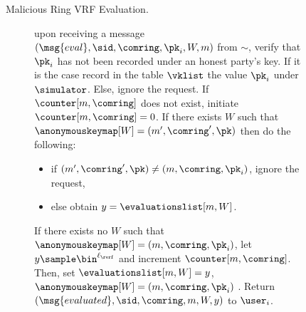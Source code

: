 \begin{figure}
\begin{tcolorbox}
{\begin{description}
				\item[Malicious Ring VRF Evaluation.] upon receiving a message $(\msg{eval}, \sid, \comring, \pk_i, W, m)$ from $\sim$, verify that $ \pk_i $ has not been recorded under an honest party's key.
			    If it is the case record in the table $\vklist$ the value $\pk_i$ under $\simulator$. Else, ignore the request.  If $ \counter[m,\comring] $ does not exist, initiate $ \counter[m,\comring] = 0 $.
			    If there exists $ W $ such that $ \anonymouskeymap[W] = (m',\comring', \pk)$ then do the following:
			    \begin{itemize}
			    	\item if $(m', \comring', \pk) \neq  (m, \comring, \pk_i)  $, ignore the request,
			    	\item else obtain $ y = \evaluationslist[m, W]   $. 
			    \end{itemize}
				If there exists no $ W $ such that $ \anonymouskeymap[W] = (m, \comring, \pk_i) $, let   $y \sample \bin^{\ell_\rvrf}$ and increment $ \counter[m,\comring] $. Then, set $ \evaluationslist[m, W] = y$, $ \anonymouskeymap[W] = (m, \comring,\pk_i) $ .
				Return $(\msg{evaluated}, \sid, \comring, m, W, y)$ to $ \user_i $.
				
				
				

\end{description}}
\end{tcolorbox}
\end{figure}
